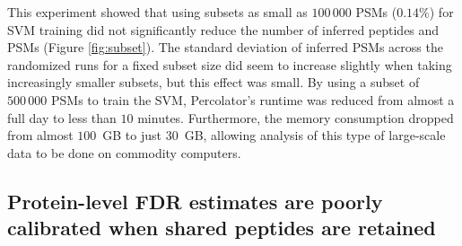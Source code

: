 \documentclass{article}
\begin{document}
This experiment showed that using subsets as small as $100\,000$ PSMs
($0.14\%$) for SVM training did not significantly reduce the number of
inferred peptides and PSMs (Figure \ref{fig:subset}). The standard
deviation of inferred PSMs across the randomized runs for a fixed
subset size did seem to increase slightly when taking increasingly
smaller subsets, but this effect was small. By using a subset of
$500\,000$ PSMs to train the SVM, Percolator's runtime was reduced
from almost a full day to less than $10$ minutes. Furthermore, the
memory consumption dropped from almost $100$~GB to just $30$~GB,
allowing analysis of this type of large-scale data to be done on
commodity computers.

\subsection*{Protein-level FDR estimates are poorly calibrated when
  shared peptides are retained}
\end{document}
